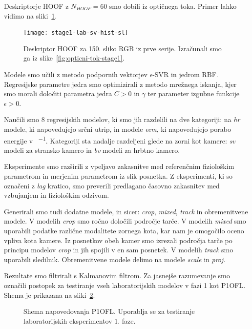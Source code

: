 Deskriptorje HOOF z $N_{HOOF} = 60 $ smo dobili iz optičnega toka. Primer lahko vidimo na sliki~\ref{fig:hoof-znacilke}.

\begin{figure}[!htb]
	\centering
	\texttt{[image: stage1-lab-sv-hist-sl]}
	\caption[Deskriptor HOOF za 150. sliko RGB iz prve serije]{Deskriptor HOOF  za 150. sliko RGB iz prve serije. Izračunali smo ga iz slike~\ref{fig:opticni-tok-stage1}.}
	\label{fig:hoof-znacilke}
\end{figure}

Modele smo učili z metodo podpornih vektorjev $\epsilon$-SVR in jedrom RBF. Regresijske parametre jedra smo optimizirali z metodo mrežnega iskanja, kjer smo morali določiti parametra jedra $C > 0$ in $\gamma$ ter parameter izgubne funkcije $\epsilon > 0$.

Naučili smo \num{8} regresijskih modelov, ki smo jih razdelili na dve kategoriji: na \textit{hr} modele, ki napovedujejo srčni utrip, in modele \textit{eem}, ki napovedujejo porabo energije v \si{\kcal\per\min}. Kategoriji sta nadalje razdeljeni glede na zorni kot kamere: \textit{sv} modeli za stransko kamero in \textit{bv} modeli za hrbtno kamero. 

Eksperimente smo razširili z vpeljavo zakasnitve med referenčnim fiziološkim parametrom in merjenim parametrom iz slik posnetka. Z eksperimenti, ki so označeni z \textit{lag} kratico, smo preverili predlagano časovno zakasnitev med vzbujanjem in fiziološkim odzivom. 

Generirali smo tudi dodatne modele, in sicer: \textit{crop}, \textit{mixed}, \textit{track} in obremenitvene modele. V modelih \textit{crop} smo ročno določili področje tarče. V modelih \textit{mixed} smo uporabili podatke različne modalitete zornega kota, kar nam je omogočilo oceno vpliva kota kamere. Iz posnetkov obeh kamer smo izrezali področja tarče po principu modelov \textit{crop} in jih spojili v en sam posnetek. V modelih \textit{track} smo uporabili sledilnik. Obremenitvene modele delimo na modele \textit{scale} in \textit{proj}. 

Rezultate smo filtrirali s Kalmanovim filtrom. Za jasnejše razumevanje smo označili
postopek za testiranje vseh laboratorijskih modelov v fazi 1 kot P1OFL. Shema je prikazana na sliki~\ref{fig:diagram-procesiranja-stage1}.


\begin{figure}[!htb]
	\centering
	\resizebox{\columnwidth}{!}{}
	\caption[Shema napovedovanja P1OFL]{Shema napovedovanja P1OFL. Uporablja se za testiranje laboratorijskih eksperimentov 1. faze.}
	\label{fig:diagram-procesiranja-stage1}
\end{figure}

